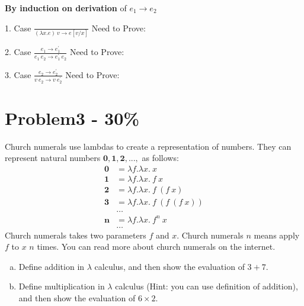 \documentclass{article}
\newcommand{\answerbox}{
    \vspace{7cm} %
}
\begin{document}
\vspace{20pt}
\textbf{By induction on derivation} of $e_1\rightarrow e_2$

1. Case $\frac{}{(\lambda x.e)\ v \rightarrow e [v/x]}$
Need to Prove:
\answerbox

2. Case $\frac{e_1 \rightarrow e_1^{'}}{e_1\ e_2 \rightarrow e_1^{'}\ e_2}$
Need to Prove:
\answerbox

3. Case $\frac{e_2 \rightarrow e_2^{'}}{v\ e_2 \rightarrow v\ e_2^{'}}$
Need to Prove:
\answerbox


\section*{Problem3 - 30\%}
Church numerals use lambdas to create a representation of numbers.
They can represent natural numbers $\mathbf{0}, \mathbf{1}, \mathbf{2}, ...,$ as follows:
\begin{align*}
    \mathbf{0} &= \lambda f.\lambda x.\ x \\
    \mathbf{1} &= \lambda f.\lambda x.\ f\ x \\
    \mathbf{2} &= \lambda f.\lambda x.\ f\ (f\ x) \\
    \mathbf{3} &= \lambda f.\lambda x.\ f\ (f\ (f\ x)) \\
    &\dots \\
    \mathbf{n} &= \lambda f.\lambda x.\ f^n\ x \\
    &\dots
\end{align*}
Church numerals takes two parameters $f$ and $x$. Church numerals $n$ means apply $f$ to $x$ $n$ times. You can read more about church numerals on the internet.
\begin{enumerate}[(a)]
    \item Define addition in $\lambda$ calculus, and then show the evaluation of $3+7$.
    \answerbox
    \item Define multiplication in $\lambda$ calculus (Hint: you can use definition of addition), and then show the evaluation of $6\times2$.
    \answerbox

\end{enumerate}

\vspace{20pt}
\end{document}
